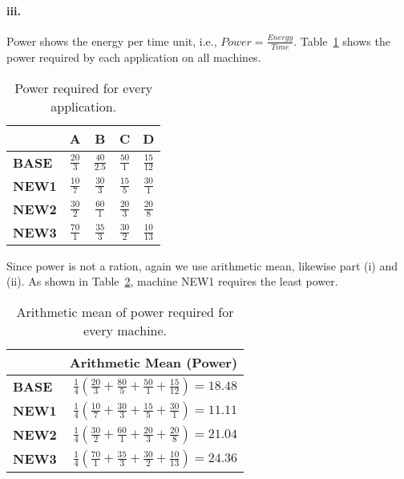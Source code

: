 \documentclass[11pt]{article}
\renewcommand{\part}[1]{\paragraph*{{#1}.}}
\begin{document}
\part{iii} Power shows the energy per time unit, i.e., $Power = 
\frac{Energy}{Time}$. Table~\ref{tbl:power} shows the power required by 
each application on all machines.

\begin{table}[h]
\center
\begin{tabular}{|l|c|c|c|c|}
	\hline
	 & \textbf{A} & \textbf{B} & \textbf{C} & \textbf{D} \\
	\hline
	\textbf{BASE} & $\frac{20}{3}$ & $\frac{40}{2.5}$ & $\frac{50}{1}$ 
	& $\frac{15}{12}$ \\
	\hline
	\textbf{NEW1} & $\frac{10}{7}$ & $\frac{30}{3}$ & $\frac{15}{5}$ 
	& $\frac{30}{1}$ \\
	\hline
	\textbf{NEW2} & $\frac{30}{2}$ & $\frac{60}{1}$ & $\frac{20}{3}$ 
	& $\frac{20}{8}$ \\
	\hline
	\textbf{NEW3} & $\frac{70}{1}$ & $\frac{35}{3}$ & $\frac{30}{2}$ 
	& $\frac{10}{13}$ \\
	\hline
\end{tabular}
\caption{Power required for every application.}
\label{tbl:power}
\end{table}

Since power is not a ration, again we use arithmetic mean, likewise part (i) and (ii). As shown in 
Table~\ref{tbl:wpwr}, machine NEW1 requires the least power.

\begin{table}[h]
\center
\begin{tabular}{|l|r|}
	\hline
	 & \textbf{Arithmetic Mean (Power)} \\
	\hline
	\textbf{BASE} & $\frac{1}{4}(\frac{20}{3} + \frac{80}{5} + \frac{50}{1} + \frac{15}{12}) = 18.48$  \\
	\hline
	\textbf{NEW1} & $\frac{1}{4}(\frac{10}{7} + \frac{30}{3} + \frac{15}{5} + \frac{30}{1}) = 11.11$ \\
	\hline
	\textbf{NEW2} & $\frac{1}{4}(\frac{30}{2} + \frac{60}{1} + \frac{20}{3} + \frac{20}{8}) = 21.04$ \\
	\hline
	\textbf{NEW3} & $\frac{1}{4}(\frac{70}{1} + \frac{35}{3} + \frac{30}{2} + 
	\frac{10}{13}) = 24.36$ \\
	\hline
\end{tabular}
\caption{Arithmetic mean of power required for every machine.}
\label{tbl:wpwr}
\end{table}
\end{document}
